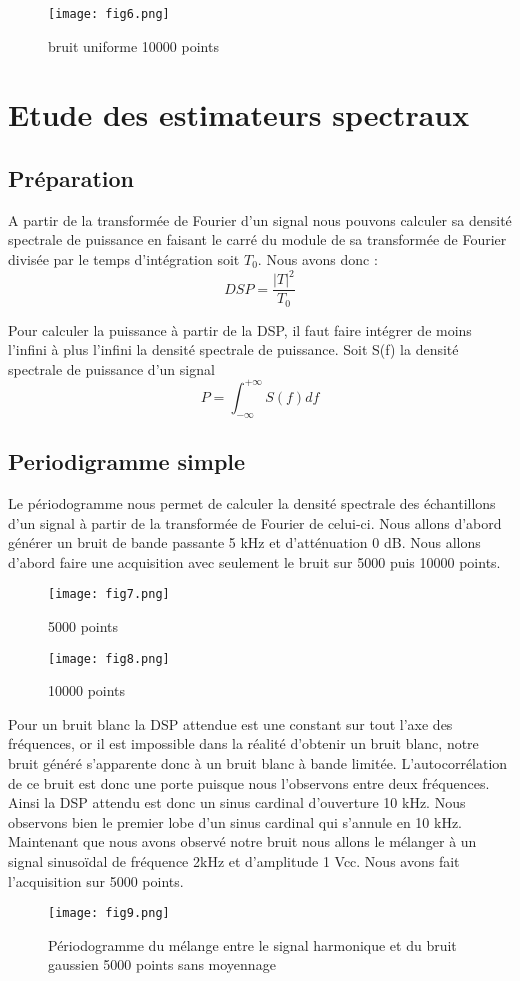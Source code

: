 \documentclass[oneside,a4paper,12pt]{article}
\begin{document}
	\begin{figure}[h]
		\centering
		\texttt{[image: fig6.png]}
		\caption{bruit uniforme 10000 points}
	\end{figure}

	\newpage
	\section{Etude des estimateurs spectraux}
	\subsection{Préparation}
	
	A partir de la transformée de Fourier d’un signal nous pouvons calculer sa densité spectrale de puissance en faisant le carré du module de sa transformée de Fourier divisée par le temps d’intégration soit $ T_{0} $. Nous avons donc :
	$$ DSP = \frac{|T|^{2}}{T_{0}} $$
	
	Pour calculer la puissance à partir de la DSP, il faut faire intégrer de moins l’infini à plus l’infini la densité spectrale de puissance. Soit S(f) la densité spectrale de puissance d’un signal
	$$ P = \int_{-\infty}^{+\infty} S(f)df $$
	
	\subsection{Periodigramme simple}
	
	Le périodogramme nous permet de calculer la densité spectrale des échantillons d’un signal à partir de la transformée de Fourier de celui-ci. Nous allons d’abord générer un bruit de bande passante 5 kHz et d’atténuation 0 dB. Nous allons d’abord faire une acquisition avec seulement le bruit sur 5000 puis 10000 points. 
	\begin{figure}[h]
		\centering
		\texttt{[image: fig7.png]}
		\caption{5000 points}
	\end{figure}

	\newpage
	\begin{figure}[h]
		\centering
		\texttt{[image: fig8.png]}
		\caption{10000 points}
	\end{figure}

	Pour un bruit blanc la DSP attendue est une constant sur tout l’axe des fréquences, or il est impossible dans la réalité d’obtenir un bruit blanc, notre bruit généré s’apparente donc à un bruit blanc à bande limitée. L’autocorrélation de ce bruit est donc une porte puisque nous l’observons entre deux fréquences. Ainsi la DSP attendu est donc un sinus cardinal d’ouverture 10 kHz. Nous observons bien  le premier lobe d’un sinus cardinal qui s’annule en 10 kHz.
	\newpage
	Maintenant que nous avons observé notre bruit nous allons le mélanger à un signal sinusoïdal de fréquence 2kHz et d’amplitude 1 Vcc. Nous avons fait l’acquisition sur 5000 points.\\
	\begin{figure}[h]
		\centering
		\texttt{[image: fig9.png]}
		\caption{Périodogramme du mélange entre le signal harmonique et du bruit gaussien 5000 points sans moyennage}
	\end{figure}
\end{document}
